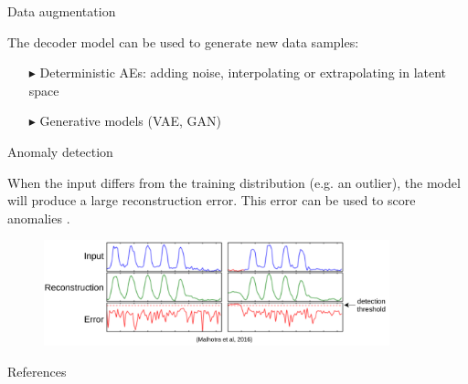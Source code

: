 \documentclass{beamer}
\begin{document}
  \begin{frame}{Data augmentation}

    The decoder model can be used to \alert{generate new data samples}:

    \begin{itemize}
      \item[$\blacktriangleright$] Deterministic AEs: adding noise, interpolating or extrapolating in latent space \cite{Devries2017}
      \item[$\blacktriangleright$] Generative models (VAE, GAN)
    \end{itemize}

  \end{frame}

  \begin{frame}{Anomaly detection}
    
    When the input differs from the training distribution (e.g. an outlier), the model will produce a large reconstruction error. This error can be used to \alert{score anomalies} \cite{Malhotra2016}.

    \begin{figure}
      \includegraphics[width=10cm]{rc/anomaly-detection}
    \end{figure}

  \end{frame}

  \appendix

  \begin{frame}[allowframebreaks]{References}
    
    
    
  
  \end{frame}
\end{document}
